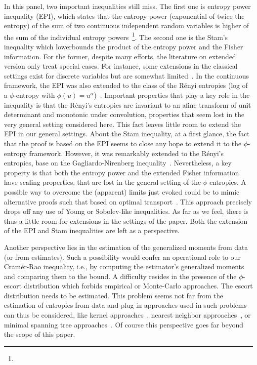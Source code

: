 \documentclass[english,sort&compress]{elsarticle}
\theoremstyle{definition}
\theoremstyle{plain}
\theoremstyle{plain}
\begin{document}
{In this panel, two important inequalities still miss. The first one is entropy power inequality (EPI), which states that the entropy power (exponential of twice the entropy) of the sum of two continuous independent random variables is higher of the sum of the individual entropy
 powers~\footnote{}. The second one is the Stam's inequality which lowerbounds the product of the entropy power and the Fisher information. For the former, despite many efforts, the literature on extended version only treat special cases. For instance, some extensions in the classical settings exist for discrete variables but are somewhat limited~\cite{HarVig03, JohYu10, HagAbb14}. In the continuous framework, the
 EPI was also extended to the class of the R\'enyi entropies (log of a $\phi$-entropy with $\phi(u) = u^\alpha$)~\cite{BobChi15}. Important properties that play a key role in the inequality is that the R\'enyi's entropies are invariant to an afine transform of unit determinant and monotonic under convolution, properties that seem lost in the very general setting considered here. This fact leaves little room to extend the EPI in our general settings. About the Stam inequality, at a first glance, the fact that the proof is based on the EPI seems to close any hope to extend it to the $\phi$-entropy framework. However, it was remarkably extended to the R\'enyi's entropies, base on the Gagliardo-Nirenberg inequality~\cite{Ber12:06_1, LutYan05, LutLv12, ZozPue17}. Nevertheless, a key property is that both the entropy power and the extended Fisher information have scaling properties,
 that are lost in the general setting of the $\phi$-entropies. A possible way to overcome the (apparent) limits just evoked could be to mimic alternative proofs such that based on optimal transport~\cite{Rio17}. This approach precisely drops off any use of Young or Sobolev-like inequalities. As far as we feel, there is thus a little room for extensions in the settings of the paper. Both the extension of the EPI and Stam inequalities are left as a  perspective.

 Another perspective lies in the estimation of the generalized moments from data (or from estimates). Such a possibility would confer an operational role to our Cram\'er-Rao inequality, i.e., by computing the estimator's generalized moments and comparing them to the bound. A difficulty resides in the presence of the $\phi$-escort distribution which forbids empirical or Monte-Carlo approaches. The escort distribution needs to be estimated. This problem seems not far from the estimation of entropies from data and plug-in approaches used in such problems can thus be considered, like kernel approaches~\cite{Ros56, Par62, BeiDud97}, nearest neighbor approaches~\cite{LeoPro08, BeiDud97}, or minimal spanning tree approaches~\cite{HerMa02}. Of course this perspective goes far beyond the scope of this paper. 
 }
\end{document}
